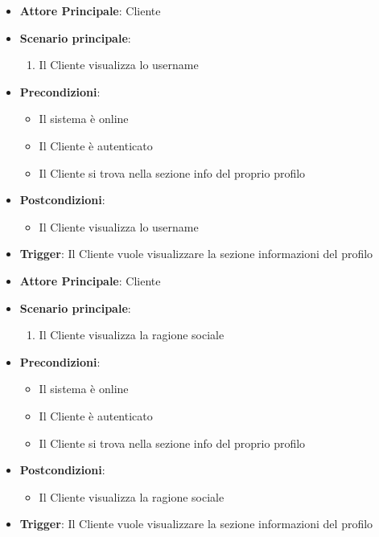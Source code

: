 \label{uc_07.1}
\begin{itemize}
    \item \textbf{Attore Principale}: Cliente
    \item \textbf{Scenario principale}:
    \begin{enumerate}
        \item Il Cliente visualizza lo username
    \end{enumerate}
    \item \textbf{Precondizioni}:
    \begin{itemize}
        \item Il sistema è online
        \item Il Cliente è autenticato
        \item Il Cliente si trova nella sezione info del proprio profilo
    \end{itemize}      
    \item \textbf{Postcondizioni}:
    \begin{itemize}
        \item Il Cliente visualizza lo username
    \end{itemize}
    \item \textbf{Trigger}: Il Cliente vuole visualizzare la sezione informazioni del profilo
\end{itemize}

\label{uc_07.2}
\begin{itemize}
    \item \textbf{Attore Principale}: Cliente
    \item \textbf{Scenario principale}:
            \begin{enumerate}
                \item Il Cliente visualizza la ragione sociale
            \end{enumerate}
    \item \textbf{Precondizioni}:
            \begin{itemize}
                \item Il sistema è online
                \item Il Cliente è autenticato
                \item Il Cliente si trova nella sezione info del proprio profilo
            \end{itemize}      
    \item \textbf{Postcondizioni}:
            \begin{itemize}
                \item Il Cliente visualizza la ragione sociale
            \end{itemize}
    \item \textbf{Trigger}: Il Cliente vuole visualizzare la sezione informazioni del profilo
\end{itemize}

